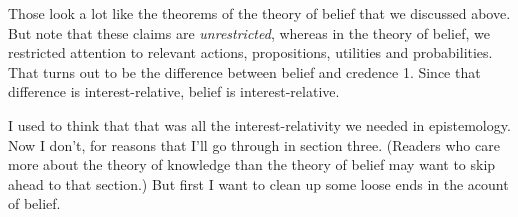 \noindent Those look a lot like the theorems of the theory of belief that we discussed above. But note that these claims are \textit{unrestricted}, whereas in the theory of belief, we restricted attention to relevant actions, propositions, utilities and probabilities. That turns out to be the difference between belief and credence 1. Since that difference is interest-relative, belief is interest-relative.

I used to think that that was all the interest-relativity we needed in epistemology. Now I don't, for reasons that I'll go through in section three. (Readers who care more about the theory of knowledge than the theory of belief may want to skip ahead to that section.) But first I want to clean up some loose ends in the acount of belief.
